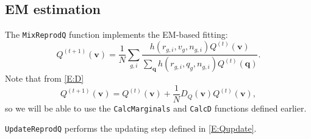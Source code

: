 \documentclass[reqno]{amsart}
\newcommand{\bv}{\mathbf{v}}
\newcommand{\bq}{\mathbf{q}}
\begin{document}
\subsection{EM estimation}
The \texttt{MixReprodQ} function implements the EM-based fitting:
\begin{equation}\label{E:Qupdate}
Q^{(t+1)}(\bv)=\frac{1}{N}\sum_{g,i}\frac{h(r_{g,i},v_g,n_{g,i}) Q^{(t)}(\bv)}{\sum_\bq
h(r_{g,i},q_g,n_{g,i}) Q^{(t)}(\bq)}.
\end{equation}
Note that from \eqref{E:D}
\begin{equation}
 Q^{(t+1)}(\bv) = Q^{(t)}(\bv) + \frac{1}{N}D_Q(\bv)Q^{(t)}(\bv),
\end{equation}
so we will be able to use the \texttt{CalcMarginals} and \texttt{CalcD} functions
defined earlier.

\texttt{UpdateReprodQ} performs the updating step defined in \eqref{E:Qupdate}.
\end{document}
